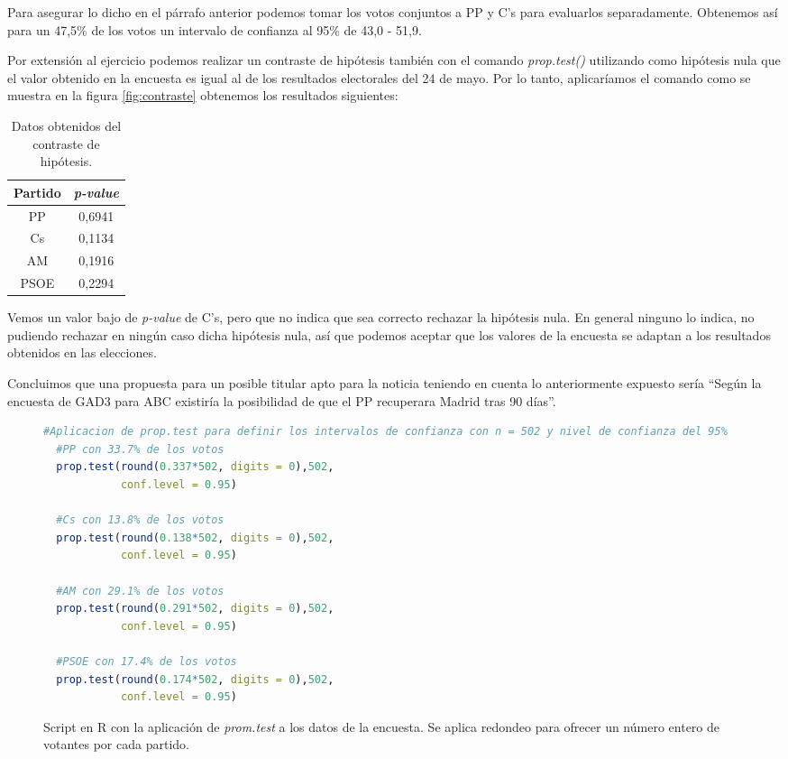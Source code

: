 \documentclass[11pt,a4paper]{article}
\begin{document}
Para asegurar lo dicho en el párrafo anterior podemos tomar los votos conjuntos a PP y C's para evaluarlos separadamente. Obtenemos así para un 47,5\% de los votos un intervalo de confianza al 95\% de 43,0 - 51,9.

Por extensión al ejercicio podemos realizar un contraste de hipótesis también con el comando \textit{prop.test()} utilizando como hipótesis nula que el valor obtenido en la encuesta es igual al de los resultados electorales del 24 de mayo. Por lo tanto, aplicaríamos el comando como se muestra en la figura \ref{fig:contraste} obtenemos los resultados siguientes:

\begin{table}[ht]
	\centering
	\begin{tabular}{cc}
	\toprule[0.4mm]
	Partido & \textit{p-value}\\
	\midrule
	PP & {\color{green} 0,6941} \\
	Cs & {\color{orange} 0,1134} \\
	AM & {\color{green} 0,1916} \\
	PSOE & {\color{green} 0,2294} \\
	\bottomrule[0.4mm]
	\end{tabular}
	\caption{Datos obtenidos del contraste de hipótesis.}
\label{tab:contraste}
\end{table}

Vemos un valor bajo de \textit{p-value} de C's, pero que no indica que sea correcto rechazar la hipótesis nula. En general ninguno lo indica, no pudiendo rechazar en ningún caso dicha hipótesis nula, así que podemos aceptar que los valores de la encuesta se adaptan a los resultados obtenidos en las elecciones.

Concluimos que una propuesta para un posible titular apto para la noticia teniendo en cuenta lo anteriormente expuesto sería ``Según la encuesta de GAD3 para ABC existiría la posibilidad de que el PP recuperara Madrid tras 90 días''.

\begin{figure}
\centering
\begin{lstlisting}[language=R]
  #Aplicacion de prop.test para definir los intervalos de confianza con n = 502 y nivel de confianza del 95%
  #PP con 33.7% de los votos
  prop.test(round(0.337*502, digits = 0),502,
            conf.level = 0.95)

  #Cs con 13.8% de los votos
  prop.test(round(0.138*502, digits = 0),502,
            conf.level = 0.95)

  #AM con 29.1% de los votos
  prop.test(round(0.291*502, digits = 0),502,
            conf.level = 0.95)

  #PSOE con 17.4% de los votos
  prop.test(round(0.174*502, digits = 0),502,
            conf.level = 0.95)
\end{lstlisting}
\caption{Script en R con la aplicación de \textit{prom.test} a los datos de la encuesta. Se aplica redondeo para ofrecer un número entero de votantes por cada partido.}
\label{fig:proptest}
\end{figure}
\end{document}

